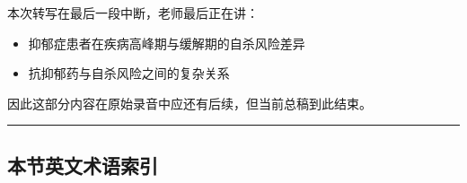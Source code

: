 \documentclass[
  chinese,
  9pt,
  a4paper,
]{ctexart}
\providecommand{\tightlist}{%
  \setlength{\itemsep}{0pt}\setlength{\parskip}{0pt}}
\begin{document}
本次转写在最后一段中断，老师最后正在讲：

\begin{itemize}
\tightlist
\item
  抑郁症患者在疾病高峰期与缓解期的自杀风险差异
\item
  抗抑郁药与自杀风险之间的复杂关系
\end{itemize}

因此这部分内容在原始录音中应还有后续，但当前总稿到此结束。

\begin{center}\rule{0.5\linewidth}{0.5pt}\end{center}

\subsection{本节英文术语索引}\label{ux672cux8282ux82f1ux6587ux672fux8bedux7d22ux5f15-2}
\end{document}
